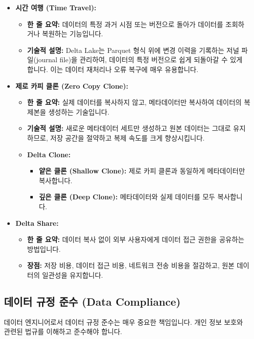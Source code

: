 \documentclass[11pt,a4paper]{article}
\theoremstyle{definition}
\begin{document}
\begin{itemize}
    \item \textbf{시간 여행 (Time Travel):}
    \begin{itemize}
        \item \textbf{한 줄 요약:} 데이터의 특정 과거 시점 또는 버전으로 돌아가 데이터를 조회하거나 복원하는 기능입니다.
        \item \textbf{기술적 설명:} Delta Lake는 Parquet 형식 위에 변경 이력을 기록하는 저널 파일(journal file)을 관리하여, 데이터의 특정 버전으로 쉽게 되돌아갈 수 있게 합니다. 이는 데이터 재처리나 오류 복구에 매우 유용합니다.
    \end{itemize}
    \item \textbf{제로 카피 클론 (Zero Copy Clone):}
    \begin{itemize}
        \item \textbf{한 줄 요약:} 실제 데이터를 복사하지 않고, 메타데이터만 복사하여 데이터의 복제본을 생성하는 기술입니다.
        \item \textbf{기술적 설명:} 새로운 메타데이터 세트만 생성하고 원본 데이터는 그대로 유지하므로, 저장 공간을 절약하고 복제 속도를 크게 향상시킵니다.
        \item \textbf{Delta Clone:}
        \begin{itemize}
            \item \textbf{얕은 클론 (Shallow Clone):} 제로 카피 클론과 동일하게 메타데이터만 복사합니다.
            \item \textbf{깊은 클론 (Deep Clone):} 메타데이터와 실제 데이터를 모두 복사합니다.
        \end{itemize}
    \end{itemize}
    \item \textbf{Delta Share:}
    \begin{itemize}
        \item \textbf{한 줄 요약:} 데이터 복사 없이 외부 사용자에게 데이터 접근 권한을 공유하는 방법입니다.
        \item \textbf{장점:} 저장 비용, 데이터 접근 비용, 네트워크 전송 비용을 절감하고, 원본 데이터의 일관성을 유지합니다.
    \end{itemize}
\end{itemize}

\subsection{데이터 규정 준수 (Data Compliance)}
데이터 엔지니어로서 데이터 규정 준수는 매우 중요한 책임입니다. 개인 정보 보호와 관련된 법규를 이해하고 준수해야 합니다.
\end{document}
